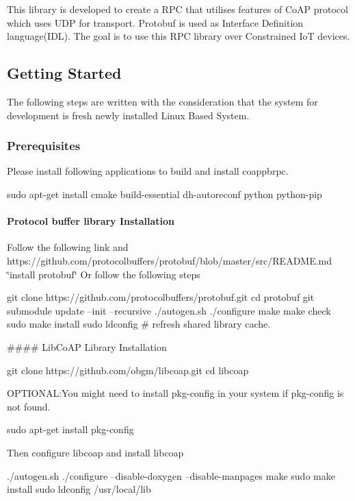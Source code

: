 This library is developed to create a R\+PC that utilises features of Co\+AP protocol which uses U\+DP for transport. Protobuf is used as Interface Definition language(\+I\+D\+L). The goal is to use this R\+PC library over Constrained IoT devices.

\subsection*{Getting Started}

The following steps are written with the consideration that the system for development is fresh newly installed Linux Based System.

\subsubsection*{Prerequisites}

Please install following applications to build and install coappbrpc. 
\begin{DoxyCode}
sudo apt-get install cmake build-essential dh-autoreconf python python-pip
\end{DoxyCode}
 \paragraph*{Protocol buffer library Installation}

Follow the following link and https\+://github.com/protocolbuffers/protobuf/blob/master/src/\+R\+E\+A\+D\+M\+E.\+md \char`\"{}install protobuf\char`\"{} Or follow the following steps 
\begin{DoxyCode}
git clone https://github.com/protocolbuffers/protobuf.git
cd protobuf
git submodule update --init --recursive
./autogen.sh
./configure
make
make check
sudo make install
sudo ldconfig # refresh shared library cache.
\end{DoxyCode}


\#\#\#\# Lib\+Co\+AP Library Installation 
\begin{DoxyCode}
git clone https://github.com/obgm/libcoap.git
cd libcoap
\end{DoxyCode}
 O\+P\+T\+I\+O\+N\+AL\+:You might need to install pkg-\/config in your system if \textquotesingle{}pkg-\/config\textquotesingle{} is not found. 
\begin{DoxyCode}
sudo apt-get install pkg-config
\end{DoxyCode}
 Then configure libcoap and install libcoap 
\begin{DoxyCode}
./autogen.sh
./configure --disable-doxygen --disable-manpages
make
sudo make install
sudo ldconfig /usr/local/lib
\end{DoxyCode}


